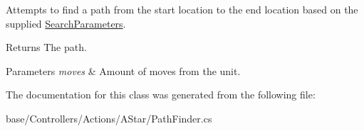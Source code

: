 Attempts to find a path from the start location to the end location based on the supplied \hyperlink{classCore_1_1Controllers_1_1AStar_1_1SearchParameters}{Search\+Parameters}. 

\begin{DoxyReturn}{Returns}
The path.
\end{DoxyReturn}

\begin{DoxyParams}{Parameters}
{\em moves} & Amount of moves from the unit.\\
\hline
\end{DoxyParams}


The documentation for this class was generated from the following file\+:\begin{DoxyCompactItemize}
\item 
base/\+Controllers/\+Actions/\+A\+Star/Path\+Finder.\+cs\end{DoxyCompactItemize}
